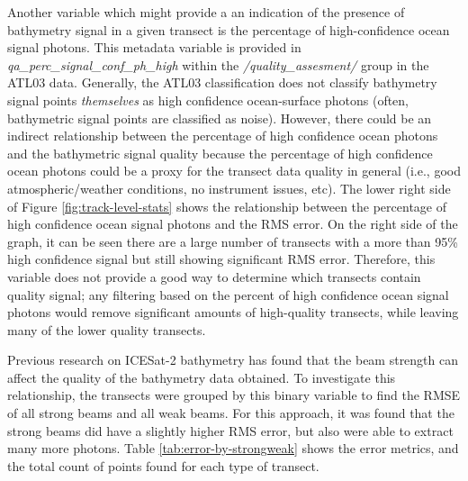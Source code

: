 Another variable which might provide a an indication of the presence of bathymetry signal in a given transect is the percentage of high-confidence ocean signal photons. This metadata variable is provided in  \emph{qa\_perc\_signal\_conf\_ph\_high} within the \emph{/quality\_assesment/} group in the ATL03 data. Generally, the ATL03 classification does not classify bathymetry signal points \emph{themselves} as high confidence ocean-surface photons (often, bathymetric signal points are classified as noise). However, there could be an indirect relationship between the percentage of high confidence ocean photons and the bathymetric signal quality because the percentage of high confidence ocean photons could be a proxy for the transect data quality in general (i.e., good atmospheric/weather conditions, no instrument issues, etc). The lower right side of Figure \ref{fig:track-level-stats} shows the relationship between the percentage of high confidence ocean signal photons and the RMS error. On the right side of the graph, it can be seen there are a large number of transects with a more than 95\% high confidence signal but still showing significant RMS error. Therefore, this variable does not provide a good way to determine which transects contain quality signal; any filtering based on the percent of high confidence ocean signal photons would remove significant amounts of high-quality transects, while leaving many of the lower quality transects.

Previous research on ICESat-2 bathymetry has found that the beam strength can affect the quality of the bathymetry data obtained. To investigate this relationship, the transects were grouped by this binary variable to find the RMSE of all strong beams and all weak beams. For this approach, it was found that the strong beams did have a slightly higher RMS error, but also were able to extract many more photons. Table \ref{tab:error-by-strongweak} shows the error metrics, and the total count of points found for each type of transect.




